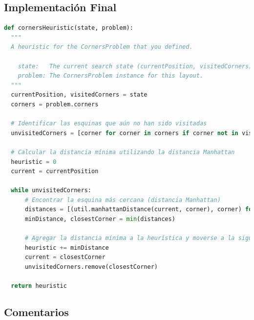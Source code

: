 \documentclass{report}
\begin{document}
        \subsection*{Implementación Final}
          \begin{lstlisting}[language=Python, caption=Implementación final de la heurística del problema de las esquinas]
def cornersHeuristic(state, problem):
  """
  A heuristic for the CornersProblem that you defined.

    state:   The current search state (currentPosition, visitedCorners)
    problem: The CornersProblem instance for this layout.
  """
  currentPosition, visitedCorners = state
  corners = problem.corners

  # Identificar las esquinas que aún no han sido visitadas
  unvisitedCorners = [corner for corner in corners if corner not in visitedCorners]

  # Calcular la distancia mínima utilizando la distancia Manhattan
  heuristic = 0
  current = currentPosition

  while unvisitedCorners:
      # Encontrar la esquina más cercana (distancia Manhattan)
      distances = [(util.manhattanDistance(current, corner), corner) for corner in unvisitedCorners]
      minDistance, closestCorner = min(distances)
      
      # Agregar la distancia mínima a la heurística y moverse a la siguiente esquina
      heuristic += minDistance
      current = closestCorner
      unvisitedCorners.remove(closestCorner)

  return heuristic        
          \end{lstlisting}
        \subsection*{Comentarios}
\end{document}
